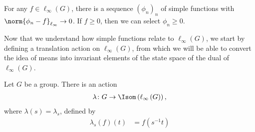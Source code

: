 \begin{corollary}
  For any $f\in \ell_{\infty}\left(G\right)$, there is a sequence $\left(\phi_n\right)_n$ of simple functions with $\norm{\phi_n -f}_{\ell_{\infty}}\rightarrow 0$. If $f\geq 0$, then we can select $\phi_n\geq 0$.
\end{corollary}
Now that we understand how simple functions relate to $\ell_{\infty}(G)$, we start by defining a translation action on $\ell_{\infty}(G)$, from which we will be able to convert the idea of means into invariant elements of the state space of the dual of $\ell_{\infty}\left(G\right)$.
\begin{proposition}\label{prop:translation_action}
  Let $G$ be a group. There is an action
  \begin{align*}
    \lambda\colon G\rightarrow \Isom\left(\ell_{\infty}\left(G\right)\right),
  \end{align*}
  where $\lambda(s) = \lambda_s$, defined by
  \begin{align*}
    \lambda_{s}\left(f\right)\left(t\right) &= f\left(s^{-1}t\right)
  \end{align*}
\end{proposition}
